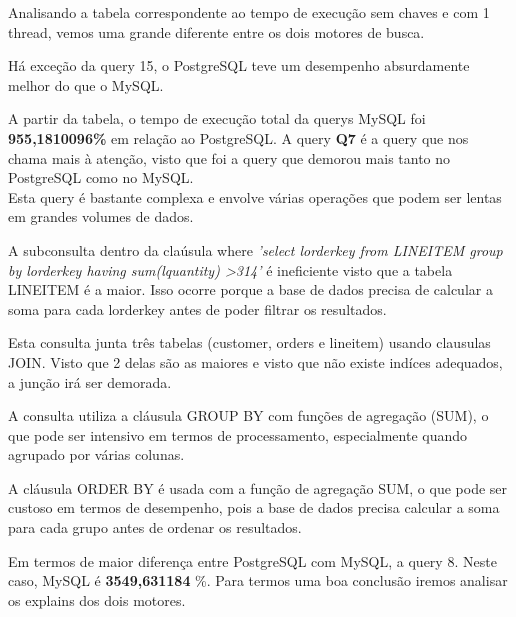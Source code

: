 \documentclass{article}
\begin{document}
Analisando a tabela correspondente ao tempo de execução sem chaves e com 1 thread, vemos uma grande diferente entre os dois motores de busca.

Há exceção da query 15, o PostgreSQL teve um desempenho absurdamente melhor do que o MySQL.

A partir da tabela, o tempo de execução total da querys MySQL foi \textbf{955,1810096\%} em relação ao PostgreSQL. A query \textbf{Q7} é a query que nos chama mais à atenção, visto que foi a query que demorou mais tanto no PostgreSQL como no MySQL. \\

Esta query é bastante complexa e envolve várias operações que podem ser lentas em grandes volumes de dados.

A subconsulta dentro da claúsula where \textit{'select l\underline{}orderkey from LINEITEM group by l\underline{}orderkey having sum(l\underline{}quantity) \textgreater 314'} é ineficiente visto que a tabela LINEITEM é a maior. Isso ocorre porque a base de dados precisa de calcular a soma para cada l\underline{}orderkey antes de poder filtrar os resultados.

Esta consulta junta três tabelas (customer, orders e lineitem) usando clausulas JOIN. Visto que 2 delas são as maiores e visto que não existe indíces adequados, a junção irá ser demorada. 

 A consulta utiliza a cláusula GROUP BY com funções de agregação (SUM), o que pode ser intensivo em termos de processamento, especialmente quando agrupado por várias colunas.

A cláusula ORDER BY é usada com a função de agregação SUM, o que pode ser custoso em termos de desempenho, pois a base de dados precisa calcular a soma para cada grupo antes de ordenar os resultados.


Em termos de maior diferença entre PostgreSQL com MySQL, a query 8. Neste caso, MySQL é \textbf{3549,631184} \%.  Para termos uma boa conclusão iremos analisar os explains dos dois motores.\\
\end{document}
